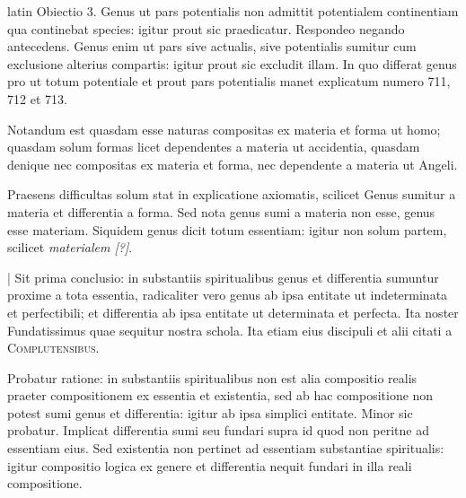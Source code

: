 \begin{otherlanguage*}{latin}
\pstart
Obiectio 3. Genus ut pars potentialis non admittit potentialem continentiam qua continebat species:
igitur prout sic praedicatur. Respondeo negando antecedens. Genus enim ut pars sive actualis, sive potentialis sumitur cum exclusione alterius compartis:
igitur prout sic excludit illam. In quo differat genus pro ut totum potentiale et prout pars potentialis manet explicatum numero 711, 712 et 713. 
\pend

\pstart
{}
\pend

\pstart
Notandum est quasdam esse naturas compositas ex materia et forma ut homo; quasdam solum formas licet dependentes a materia ut accidentia, quasdam denique nec compositas ex materia et forma, nec dependente a materia ut Angeli. 
\pend

\pstart
Praesens difficultas solum stat in explicatione axiomatis, scilicet Genus sumitur a materia et differentia a forma. Sed nota genus sumi a materia non esse, genus esse materiam. Siquidem genus dicit totum essentiam:
igitur non solum partem, scilicet \emph{materialem [?]}. 
\pend

\pstart
\textnormal{|} Sit prima conclusio:
in substantiis spiritualibus genus et differentia sumuntur proxime a tota essentia, radicaliter vero genus ab ipsa entitate ut indeterminata et perfectibili; et differentia ab ipsa entitate ut determinata et perfecta. Ita noster Fundatissimus  quae sequitur nostra schola. Ita etiam  eius discipuli et alii citati a \textsc{Complutensibus}\index[persons]{}. 
\pend

\pstart
Probatur ratione:
in substantiis spiritualibus non est alia compositio realis praeter compositionem ex essentia et existentia, sed ab hac compositione non potest sumi genus et differentia:
igitur ab ipsa simplici entitate. Minor sic probatur. Implicat differentia sumi seu fundari supra id quod non peritne ad essentiam eius. Sed existentia non pertinet ad essentiam substantiae spiritualis:
igitur compositio logica ex genere et differentia nequit fundari in illa reali compositione. 
\pend


\end{otherlanguage*}
